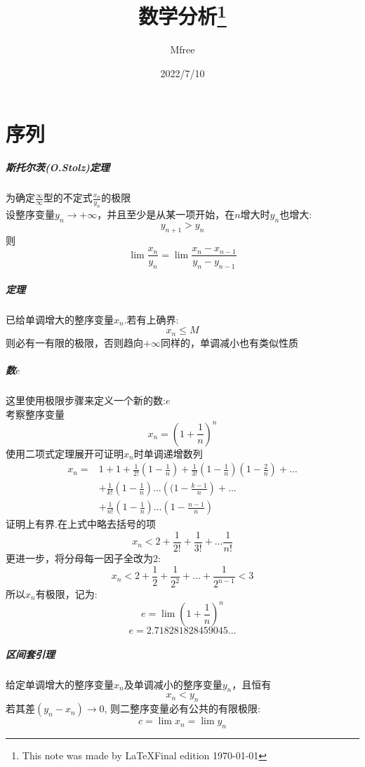\documentclass[12pt,a4paper]{report}
\begin{document}
    \title{数学分析\thanks{This note was made by \LaTeX \quad Final edition \today}}
    \date{2022/7/10}
    \author{Mfree}
    \maketitle
\tableofcontents{}
\chapter{序列}
\paragraph{斯托尔茨(O.Stolz)定理}
    为确定$\frac{\infty}{\infty}$型的不定式$\frac{x_n}{y_n}$的极限\\
    设整序变量$y_n\rightarrow +\infty$，并且至少是从某一项开始，在$n$增大时$y_n$也增大:
    $$y_{n+1} >y_n$$
    则
    $$\lim\frac{x_n}{y_n} =\lim\frac{x_n-x_{n-1}}{y_n-y_{n-1}}$$
\paragraph{定理}
    已给单调增大的整序变量$x_n$.若有上确界:
    $$x_n \leq M$$ 则必有一有限的极限，否则趋向$+\infty$同样的，单调减小也有类似性质
\paragraph{数$e$}
    这里使用极限步骤来定义一个新的数:$e$\\
    \quad 考察整序变量$$x_n=\left(1+\frac{1}{n}\right)^{n}$$
    使用二项式定理展开可证明$x_n$时单调递增数列
    \begin{align*}
        x_n=&1+1+\frac{1}{2!}\left(1-\frac{1}{n}\right)+\frac{1}{3!}\left(1-\frac{1}{n}\right)\left(1-\frac{2}{n}\right)+\dots \\
            &+\frac{1}{k!}\left(1-\frac{1}{n}\right)\dots \left((1-\frac{k-1}{n}\right)+\dots \\
            &+\frac{1}{n!}\left(1-\frac{1}{n}\right)\dots \left(1-\frac{n-1}{n}\right)
    \end{align*}
    证明上有界.在上式中略去括号的项
    $$x_n<2+\frac{1}{2!}+\frac{1}{3!}+\dots \frac{1}{n!}$$
    更进一步，将分母每一因子全改为2:
    $$x_n<2+\frac{1}{2}+\frac{1}{2^2}+\dots +\frac{1}{2^{n-1}}<3$$
    所以$x_n$有极限，记为:
    $$e=\lim \left(1+\frac{1}{n}\right)^n$$
    $$e=2.718281828459045\dots$$
\paragraph{区间套引理}
    给定单调增大的整序变量$x_n$及单调减小的整序变量$y_n$，且恒有$$x_n<y_n$$
    若其差$(y_n-x_n) \rightarrow 0$, 则二整序变量必有公共的有限极限:
    $$c=\lim x_n=\lim y_n$$
\end{document}
